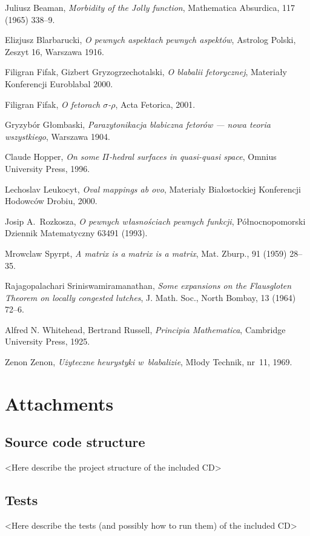 \documentclass[licencjacka,en]{pracamgr}
\begin{document}
\appendix

\begin{thebibliography}{99}\label{r:bibliography}

 Juliusz Beaman, \textit{Morbidity of the Jolly
    function}, Mathematica Absurdica, 117 (1965) 338--9.

 Elizjusz Blarbarucki, \textit{O pewnych
    aspektach pewnych aspektów}, Astrolog Polski, Zeszyt 16, Warszawa
  1916.

 Filigran Fifak, Gizbert Gryzogrzechotalski,
  \textit{O blabalii fetorycznej}, Materiały Konferencji Euroblabal
  2000.

 Filigran Fifak, \textit{O fetorach
    $\sigma$-$\rho$}, Acta Fetorica, 2001.

 Gryzybór Głombaski, \textit{Parazytonikacja
    blabiczna fetorów --- nowa teoria wszystkiego}, Warszawa 1904.

 Claude Hopper, \textit{On some $\Pi$-hedral
    surfaces in quasi-quasi space}, Omnius University Press, 1996.

 Lechoslav Leukocyt, \textit{Oval mappings ab ovo},
  Materiały Białostockiej Konferencji Hodowców Drobiu, 2000.

 Josip A.~Rozkosza, \textit{O pewnych własnościach
    pewnych funkcji}, Północnopomorski Dziennik Matematyczny 63491
  (1993).

 Mrowclaw Spyrpt, \textit{A matrix is a matrix
    is a matrix}, Mat. Zburp., 91 (1959) 28--35.

 Rajagopalachari Sriniswamiramanathan,
  \textit{Some expansions on the Flausgloten Theorem on locally
    congested lutches}, J. Math.  Soc., North Bombay, 13 (1964) 72--6.

 Alfred N. Whitehead, Bertrand Russell,
  \textit{Principia Mathematica}, Cambridge University Press, 1925.

 Zenon Zenon, \textit{Użyteczne heurystyki
    w~blabalizie}, Młody Technik, nr~11, 1969.

\end{thebibliography}



\chapter*{Attachments}\label{r:attachments}

\section*{Source code structure}

<Here describe the project structure of the included CD>


\section*{Tests}

<Here describe the tests (and possibly how to run them) of the included CD>
\end{document}
